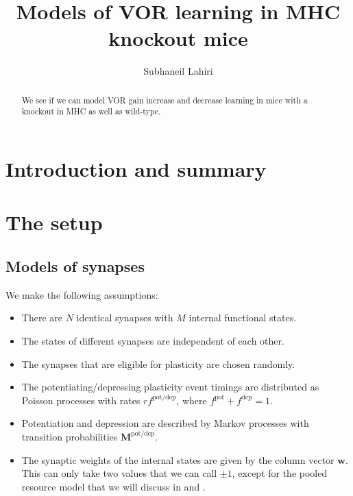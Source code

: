 \documentclass[12pt]{article}
\title{Models of VOR learning in MHC knockout mice}
\author{Subhaneil Lahiri
%
}
\newcommand{\w}{\mathbf{w}}
\newcommand{\M}{\mathbf{M}}
\newcommand{\pot}{^{\text{pot}}}
\newcommand{\dep}{^{\text{dep}}}
\newcommand{\potdep}{^{\text{pot/dep}}}
\begin{document}
\maketitle




\begin{abstract}
  We see if we can model VOR gain increase and decrease learning in mice with a knockout in MHC as well as wild-type.
\end{abstract}

\tableofcontents


\section{Introduction and summary}\label{sec:intro}




\section{The setup}\label{sec:setup}


\subsection{Models of synapses}\label{sec:synapse}

We make the following assumptions:
\begin{itemize}
  \item There are $N$ identical synapses with $M$ internal functional states.
  \item The states of different synapses are independent of each other.
  \item The synapses that are eligible for plasticity are chosen randomly.
  \item The potentiating/depressing plasticity event timings are distributed as Poisson processes with rates $rf\potdep$, where $f\pot+f\dep=1$.
  \item Potentiation and depression are described by Markov processes with transition probabilities $\M\potdep$.
  \item The synaptic weights of the internal states are given by the column vector $\w$. This can only take two values that we can call $\pm1$, except for the pooled resource model that we will discuss in  and .
\end{itemize}
\end{document}
